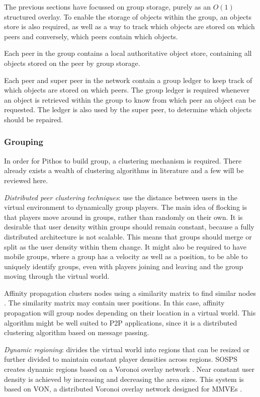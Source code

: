 The previous sections have focussed on group storage, purely as an $O(1)$ structured overlay. To enable the storage of objects within the group, an objects store is also required, as well as a way to track which objects are stored on which peers and conversely, which peers contain which objects.

Each peer in the group contains a local authoritative object store, containing all objects stored on the peer by group storage.

Each peer and super peer in the network contain a group ledger to keep track of which objects are stored on which peers. The group ledger is required whenever an object is retrieved within the group to know from which peer an object can be requested. The ledger is also used by the super peer, to determine which objects should be repaired.

\subsubsection{Grouping}
\label{grouping_design}

In order for Pithos to build group, a clustering mechanism is required. There already exists a wealth of clustering algorithms in literature and a few will be reviewed here.

\emph{Distributed peer clustering techniques}: use the distance between users in the virtual environment to dynamically group players. The main idea of flocking is that players move around in groups, rather than randomly on their own. It is desirable that user density within groups should remain constant, because a fully distributed architecture is not scalable. This means that groups should merge or split as the user density within them change. It might also be required to have mobile groups, where a group has a velocity as well as a position, to be able to uniquely identify groups, even with players joining and leaving and the group moving through the virtual world.

Affinity propagation clusters nodes using a similarity matrix to find similar nodes \cite{affinity_propagation}. The similarity matrix may contain user positions. In this case, affinity propagation will group nodes depending on their location in a virtual world. This algorithm might be well suited to P2P applications, since it is a distributed clustering algorithm based on message passing.

\emph{Dynamic regioning}: divides the virtual world into regions that can be resized or further divided to maintain constant player densities across regions. SOSPS \cite{self_organising_sps_post} creates dynamic regions based on a Voronoi overlay network \cite{voronoi_diagrams_survey}. Near constant user density is achieved by increasing and decreasing the area sizes. This system is based on VON, a distributed Voronoi overlay network designed for MMVEs \cite{VON_VAST}.

